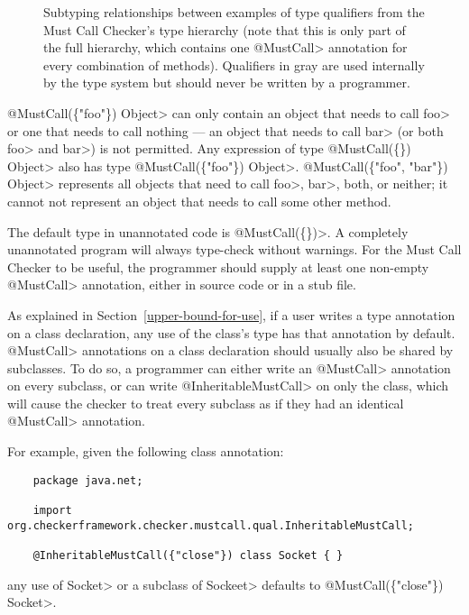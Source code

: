 \begin{figure}
\caption{Subtyping relationships between examples of type qualifiers from the Must Call Checker's type
hierarchy (note that this is only part of the full hierarchy, which contains one \<@MustCall> annotation
for every combination of methods).
Qualifiers in gray are used internally by the type system but should
never be written by a programmer.}
\label{fig-must-call-hierarchy}
\end{figure}

\<@MustCall(\{"foo"\}) Object> can only
contain an object that needs to call \<foo> or one that needs to call nothing --- an
object that needs to call \<bar> (or both \<foo> and \<bar>) is not permitted.
Any expression of type \<@MustCall(\{\}) Object> also has type
\<@MustCall(\{"foo"\}) Object>.
\<@MustCall(\{"foo", "bar"\}) Object> represents all objects that need to
call \<foo>, \<bar>, both, or neither; it cannot not represent an object that needs
to call some other method.

The default type in unannotated code is \<@MustCall(\{\})>.
A completely unannotated program will always type-check without warnings.
For the Must Call Checker to be useful, the programmer should supply at least one non-empty
\<@MustCall> annotation, either in source code or in a stub file.


As explained in Section~\ref{upper-bound-for-use}, if a user writes a type
annotation on a class declaration, any use of the class's type has that
annotation by default. \<@MustCall> annotations on a class declaration should
usually also be shared by subclasses. To do so, a programmer can either write
an \<@MustCall> annotation on every subclass, or can write \<@InheritableMustCall>
on only the class, which will cause the checker to treat every subclass as if
they had an identical \<@MustCall> annotation.

For example, given the following class annotation:
\begin{Verbatim}
    package java.net;

    import org.checkerframework.checker.mustcall.qual.InheritableMustCall;

    @InheritableMustCall({"close"}) class Socket { }
\end{Verbatim}
any use of \<Socket> or a subclass of \<Sockeet> defaults to \<@MustCall(\{"close"\}) Socket>.

